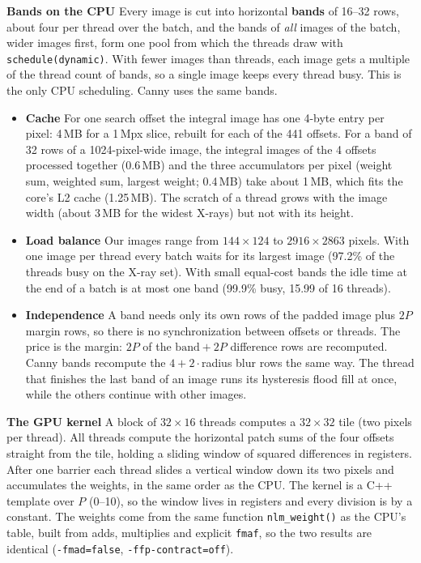 \documentclass[10pt,a4paper]{article}
\begin{document}
\textbf{Bands on the CPU} Every image is cut into horizontal \textbf{bands} of 16--32 rows, about four per thread over the batch,
and the bands of \emph{all} images of the batch, wider images first, form one pool from which the threads draw with
\texttt{schedule(dynamic)}. With fewer images than threads, each image gets a multiple of the thread count of bands, so a single
image keeps every thread busy. This is the only CPU scheduling. Canny uses the same bands.

\begin{itemize}
	\item \textbf{Cache} For one search offset the integral image has one 4-byte entry per pixel: 4\,MB for a 1\,Mpx slice,
	      rebuilt for each of the 441 offsets. For a band of 32 rows of a 1024-pixel-wide image, the integral images of the 4 offsets processed together
	      (0.6\,MB) and the three accumulators per pixel (weight sum, weighted sum, largest weight; 0.4\,MB) take about 1\,MB, which fits
	      the core's L2 cache (1.25\,MB). The scratch of a thread grows with the image width (about 3\,MB for the widest X-rays) but not with its height.
	\item \textbf{Load balance} Our images range from $144\times124$ to $2916\times2863$ pixels. With one image per thread
	      every batch waits for its largest image (97.2\% of the threads busy on the X-ray set). With small equal-cost bands
	      the idle time at the end of a batch is at most one band (99.9\% busy, 15.99 of 16 threads).
	\item \textbf{Independence} A band needs only its own rows of the padded image plus $2P$ margin rows, so there is no
	      synchronization between offsets or threads. The price is the margin: $2P$ of the $\text{band}{+}2P$ difference rows
	      are recomputed. Canny bands recompute the $4+2\cdot$radius blur rows the same way. The thread that finishes the
	      last band of an image runs its hysteresis flood fill at once, while the others continue with other images.
\end{itemize}

\textbf{The GPU kernel} A block of $32\times16$ threads computes a $32\times32$ tile (two pixels per thread). All threads compute
the horizontal patch sums of the four offsets straight from the tile, holding a sliding window of squared differences in registers.
After one barrier each thread slides a vertical window down its two pixels and accumulates the weights, in the same order as the CPU.
The kernel is a C++ template over $P$ (0--10), so the window lives in registers and every division is by a constant. The weights come
from the same function \texttt{nlm\_weight()} as the CPU's table, built from adds, multiplies and explicit \texttt{fmaf}, so the two
results are identical (\texttt{-fmad=false}, \texttt{-ffp-contract=off}).
\end{document}
